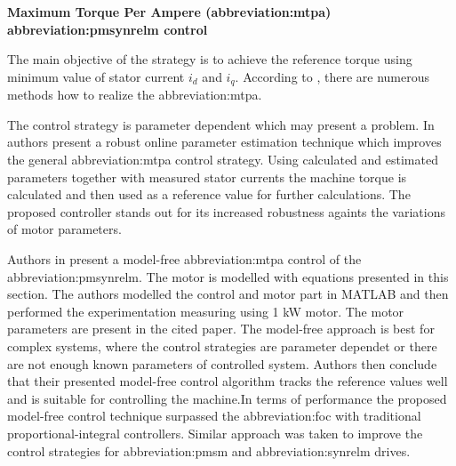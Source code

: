 \documentclass[a4paper, twoside, 11pt]{article}
\begin{document}
            \vspace*{0.45cm}
             \hspace*{-\parindent} \textbf{Maximum Torque Per Ampere (\gls{abbreviation:mtpa}) \gls{abbreviation:pmsynrelm} control}\par
                \hspace*{\parindent} The main objective of the strategy is to achieve the reference torque using minimum value of stator current $i_d$ and $i_q$. According to \cite{dwivedi-review-on-control-strategies-of-permanent-magnet-assisted-synchronous-reluctance-motor-drive}, there are numerous methods how to realize the \gls{abbreviation:mtpa}.\par
                The control strategy is parameter dependent which may present a problem. In \cite{niazi-robust-maximum-torque-per-ampere-control-of-pmsynrelm} authors present a robust online parameter estimation technique which improves the general \gls{abbreviation:mtpa} control strategy. Using calculated and estimated parameters together with measured stator currents the machine torque is calculated and then used as a reference value for further calculations. The proposed controller stands out for its increased robustness againts the variations of motor parameters.
                \par
                Authors in \cite{sriprang-Design-Modeling-and-Model-Free-Control-of-Permanent-Magnet-Assisted-Synchronous-Reluctance-Motor-for-e-Vehicle-Applications} present a model-free \gls{abbreviation:mtpa} control of the \gls{abbreviation:pmsynrelm}. The motor is modelled with equations presented in this section. The authors modelled the control and motor part in MATLAB and then performed the experimentation measuring using 1 kW motor. The motor parameters are present in the cited paper. The model-free approach is best for complex systems, where the control strategies are parameter dependet or there are not enough known parameters of controlled system. Authors then conclude that their presented model-free control algorithm tracks the reference values well and is suitable for controlling the machine.In terms of performance the proposed model-free control technique surpassed the \gls{abbreviation:foc} with traditional proportional-integral controllers. Similar approach was taken to improve the control strategies for \gls{abbreviation:pmsm} \cite{wang-Modulated-Model-Free-Predictive-Control-With-Minimum-Switching-Losses-for-PMSM-Drive-System} and \gls{abbreviation:synrelm} \cite{lin-A-Modulated-Model-Free-Predictive-Current-Control-for-Four-Switch-Three-Phase-Inverter-Fed-SynRM-Drive-Systems} drives.
\end{document}
